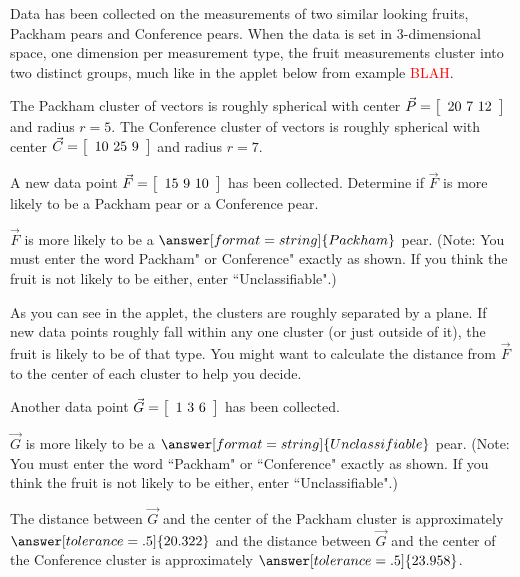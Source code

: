\documentclass{ximera}
\author{Zack Reed}
\begin{document}
\begin{exercise}

  Data has been collected on the measurements of two similar looking fruits, Packham pears and Conference pears. When the data is set in 3-dimensional space, one dimension per measurement type, the fruit measurements cluster into two distinct groups, much like in the applet below from example \textcolor{red}{BLAH}.

  \begin{center}
  \end{center}

  The Packham cluster of vectors is roughly spherical with center $\vec{P} = \startmat{c} 20 \ 7 \ 12 \stopmat$ and radius $r = 5$. The Conference cluster of vectors is roughly spherical with center $\vec{C} = \startmat{c} 10 \ 25 \ 9 \stopmat$ and radius $r = 7$.

  A new data point $\vec{F} = \startmat{c} 15 \ 9 \ 10 \stopmat$ has been collected. Determine if $\vec{F}$ is more likely to be a Packham pear or a Conference pear.
  
  $\vec{F}$ is more likely to be a $\answer[format=string]{Packham}$ pear. (Note: You must enter the word Packham" or Conference" exactly as shown. If you think the fruit is not likely to be either, enter ``Unclassifiable".)
  
  \begin{hint}
  
  As you can see in the applet, the clusters are roughly separated by a plane. If new data points roughly fall within any one cluster (or just outside of it), the fruit is likely to be of that type. You might want to calculate the distance from $\vec{F}$ to the center of each cluster to help you decide.
  
  \end{hint}
  
  Another data point $\vec{G} = \startmat{c} 1 \ 3 \ 6 \stopmat$ has been collected.
  
  $\vec{G}$ is more likely to be a $\answer[format=string]{Unclassifiable}$ pear. (Note: You must enter the word ``Packham" or ``Conference" exactly as shown. If you think the fruit is not likely to be either, enter ``Unclassifiable".)
  
  The distance between $\vec{G}$ and the center of the Packham cluster is approximately $\answer[tolerance=.5]{20.322}$ and the distance between $\vec{G}$ and the center of the Conference cluster is approximately $\answer[tolerance=.5]{23.958}$.

\end{exercise}
\end{document}
